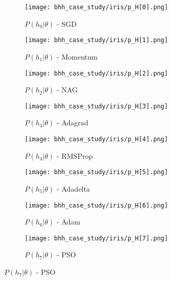 \begin{figure}[htbp]
	\begin{subfigure}{0.5\textwidth}
		\centering
		\texttt{[image: bhh\_case\_study/iris/p\_H[0].png]}
		\caption{$P\left(h_{0} | \theta \right)$ - \Acs{SGD}}
		\label{fig:results:case_study:iris:p_H:0}
	\end{subfigure}
	\begin{subfigure}{0.5\textwidth}
		\centering
		\texttt{[image: bhh\_case\_study/iris/p\_H[1].png]}
		\caption{$P\left(h_{1} | \theta \right)$ - \Acs{Momentum}}
		\label{fig:results:case_study:iris:p_H:1}
	\end{subfigure}
	\par\medskip
	\begin{subfigure}{0.5\textwidth}
		\centering
		\texttt{[image: bhh\_case\_study/iris/p\_H[2].png]}
		\caption{$P\left(h_{2} | \theta \right)$ - \Acs{NAG}}
		\label{fig:results:case_study:iris:p_H:2}
	\end{subfigure}
	\begin{subfigure}{0.5\textwidth}
		\centering
		\texttt{[image: bhh\_case\_study/iris/p\_H[3].png]}
		\caption{$P\left(h_{3} | \theta \right)$ - \Acs{Adagrad}}
		\label{fig:results:case_study:iris:p_H:3}
	\end{subfigure}
	\par\medskip
	\begin{subfigure}{0.5\textwidth}
		\centering
		\texttt{[image: bhh\_case\_study/iris/p\_H[4].png]}
		\caption{$P\left(h_{4} | \theta \right)$ - \Acs{RMSProp}}
		\label{fig:results:case_study:iris:p_H:4}
	\end{subfigure}
	\begin{subfigure}{0.5\textwidth}
		\centering
		\texttt{[image: bhh\_case\_study/iris/p\_H[5].png]}
		\caption{$P\left(h_{5} | \theta \right)$ - \Acs{Adadelta}}
		\label{fig:results:case_study:iris:p_H:5}
	\end{subfigure}
	\par\medskip
	\begin{subfigure}{0.5\textwidth}
		\centering
		\texttt{[image: bhh\_case\_study/iris/p\_H[6].png]}
		\caption{$P\left(h_{6} | \theta \right)$ - \Acs{Adam}}
		\label{fig:results:case_study:iris:p_H:6}
	\end{subfigure}
	\begin{subfigure}{0.5\textwidth}
		\centering
		\texttt{[image: bhh\_case\_study/iris/p\_H[7].png]}
		\caption{$P\left(h_{7} | \theta \right)$ - \Acs{PSO}}

\end{subfigure}
\end{figure}
